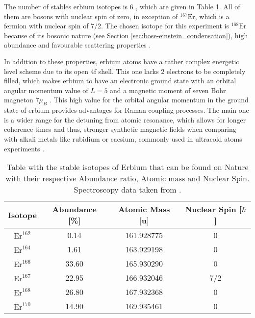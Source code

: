The number of stables erbium isotopes is 6 , which are given in Table \ref{tab:Isotopes_Erbium}. All of them are bosons with nuclear spin of zero, in exception of $^{\text{167}}\text{Er}$, which is a fermion with nuclear spin of 7/2. The chosen isotope for this experiment is $^{\text{168}}\text{Er}$ because of its bosonic nature (see Section \ref{sec:bose-einstein_condensation}), high abundance and favourable scattering properties \cite{Frisch2014}.

In addition to these properties, erbium atoms have a rather complex energetic level scheme due to its open 4f shell. This one lacks 2 electrons to be completely filled, which makes erbium to have an electronic ground state with an orbital angular momentum value of $L = 5$ and a magnetic moment of seven Bohr magneton $7\mu_B$ \cite{ban2005laser}. This high value for the orbital angular momentum in the ground state of erbium provides advantages for Raman-coupling processes. The main one is a wider range for the detuning from atomic resonance, which allows for longer coherence times and thus, stronger synthetic magnetic fields when comparing with alkali metals like rubidium or caesium, commonly used in ultracold atoms experiments  \cite{cui2013synthetic}.



\begin{table}[htbp] \centering
	\begin{tabular}{@{}c|c|c|c@{}}\hline
		Isotope                  & Abundance [\%]          & Atomic Mass [u] & Nuclear Spin [$\hbar$] \\ \hline\hline
		$\text{Er}^{\text{162}}$ &  0.14                   & 161.928775      & 0   \\
		$\text{Er}^{\text{164}}$ &  1.61                   & 163.929198      & 0   \\ 
		$\text{Er}^{\text{166}}$ & 33.60                   & 165.930290      & 0   \\
		$\text{Er}^{\text{167}}$ & 22.95                   & 166.932046      & 7/2   \\
		$\text{Er}^{\text{168}}$ & 26.80                   & 167.932368      & 0   \\  
		$\text{Er}^{\text{170}}$ & 14.90                   & 169.935461      & 0   \\  \hline
	\end{tabular}
	\caption[Table with the stable isotopes of Erbium]{Table with the stable isotopes of Erbium that can be found on Nature with their respective Abundance ratio, Atomic mass and Nuclear Spin. Spectroscopy data taken from \cite{sansonetti2005handbook}.}\label{tab:Isotopes_Erbium}
\end{table}

